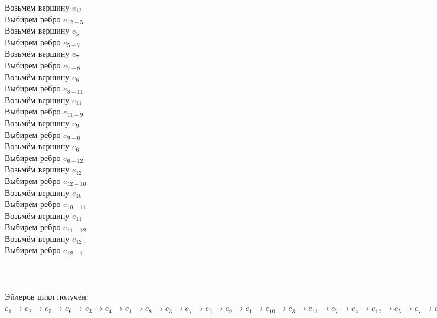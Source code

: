 \documentclass[12pt,a4paper]{report}
\begin{document}
Возьмём вершину $e_{12}$ \\
Выбирем ребро $e_{12-5}$ \\
Возьмём вершину $e_{5}$ \\
Выбирем ребро $e_{5-7}$ \\
Возьмём вершину $e_{7}$ \\
Выбирем ребро $e_{7-8}$ \\
Возьмём вершину $e_{8}$ \\ 
Выбирем ребро $e_{8-11}$ \\
Возьмём вершину $e_{11}$ \\ 
Выбирем ребро $e_{11-9}$ \\
Возьмём вершину $e_{9}$ \\
Выбирем ребро $e_{9-6}$ \\ 
Возьмём вершину $e_{6}$ \\
Выбирем ребро $e_{6-12}$ \\
Возьмём вершину $e_{12}$ \\
Выбирем ребро $e_{12-10}$ \\
Возьмём вершину $e_{10}$ \\
Выбирем ребро $e_{10-11}$ \\
Возьмём вершину $e_{11}$ \\
Выбирем ребро $e_{11-12}$ \\
Возьмём вершину $e_{12}$ \\ 
Выбирем ребро $e_{12-1}$ \\
\hfill\break
\\
\\
\\
Эйлеров цикл получен:\\
$e_{1} \rightarrow e_{2}\rightarrow e_{5}\rightarrow e_{6}\rightarrow e_{3}\rightarrow e_{4}\rightarrow e_{1}\rightarrow e_{8}\rightarrow e_{3}\rightarrow e_{7}\rightarrow e_{2}\rightarrow e_{9}\rightarrow e_{1}\rightarrow e_{10}\rightarrow e_{3}\rightarrow e_{11}\rightarrow e_{7}\rightarrow e_{4}\rightarrow e_{12}\rightarrow e_{5}\rightarrow e_{7}\rightarrow e_{8}\rightarrow e_{11}\rightarrow e_{9}\rightarrow e_{6}\rightarrow e_{12}\rightarrow e_{10}\rightarrow e_{11}\rightarrow e_{12}\rightarrow e_{1}$
\end{document}
